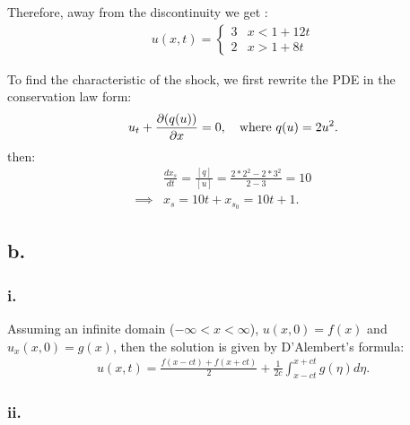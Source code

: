 \documentclass{article}
\begin{document}
Therefore, away from the discontinuity we get :
\begin{align*}
  u(x,t) = \begin{cases}
    3 & x < 1 + 12t \\
    2 & x > 1 + 8t
  \end{cases}
\end{align*}


To find the characteristic of the shock, we first rewrite the PDE in the conservation law form:
\begin{align*}
  u_t + \pdv{(q(u))}{x} = 0, \quad \text{where } q(u)=2u^2.
\end{align*}
then:
\begin{align*}
  &\frac{dx_s}{dt} = \frac{[q]}{[u]} = \frac{2*2^2 - 2*3^2}{2-3} = 10 &&\\
  \implies& x_s = 10t + x_{s_0} = 10t + 1.
\end{align*}


\newpage

\subsection*{b.}

\subsubsection*{i.}

Assuming an infinite domain ($-\infty < x < \infty$), $u(x,0) = f(x)$ and $u_x(x,0)=g(x)$, then the solution is given by D'Alembert's formula:
\begin{align*}
  u(x,t) = \frac{f(x-ct) + f(x+ct)}{2} + \frac{1}{2c} \int_{x-ct}^{x+ct} g(\eta) d\eta.
\end{align*}

\subsubsection*{ii.}
\end{document}
